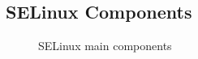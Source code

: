%
%    
%
%

\subsection{SELinux Components}

\begin{figure}
    \centering
    \label{fig:selinuxcomponents}
    
    \caption{SELinux main components}
\end{figure}

